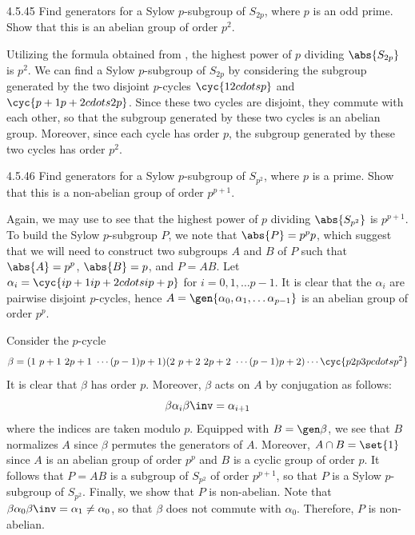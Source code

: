 \begin{exercise}{4.5.45}
	Find generators for a Sylow $p$-subgroup of $S_{2p}$, where $p$ is an odd prime.
	Show that this is an abelian group of order $p^2$.
\end{exercise}

\begin{sol}
	Utilizing the formula obtained from , the highest power of $p$ dividing $\abs{S_{2p}}$ is $p^2$.
	We can find a Sylow $p$-subgroup of $S_{2p}$ by considering the subgroup generated by the two disjoint $p$-cycles $\cyc{1 2 cdots p}$ and $\cyc{p + 1 p + 2 cdots 2p}$.
	Since these two cycles are disjoint, they commute with each other, so that the subgroup generated by these two cycles is an abelian group.
	Moreover, since each cycle has order $p$, the subgroup generated by these two cycles has order $p^2$.
\end{sol}

\begin{exercise}{4.5.46}
	Find generators for a Sylow $p$-subgroup of $S_{p^2}$, where $p$ is a prime.
	Show that this is a non-abelian group of order $p^{p + 1}$.
\end{exercise}

\begin{sol}
	Again, we may use  to see that the highest power of $p$ dividing $\abs{S_{p^2}}$ is $p^{p + 1}$.
	To build the Sylow $p$-subgroup $P$, we note that $\abs{P} = p^p p$, which suggest that we will need to construct two subgroups $A$ and $B$ of $P$ such that $\abs{A} = p^p$, $\abs{B} = p$, and $P = AB$.
	Let $\alpha_i = \cyc{ip + 1 ip + 2 cdots ip + p}$ for $i = 0, 1, \ldots p - 1$.
	It is clear that the $\alpha_i$ are pairwise disjoint $p$-cycles, hence $A = \gen{\alpha_0, \alpha_1, \ldots \alpha_{p - 1}}$ is an abelian group of order $p^p$.

	Consider the $p$-cycle
	\[
		\beta = (1\ p + 1\ 2p + 1\ \cdots (p - 1)p + 1)(2\ p + 2\ 2p + 2\ \cdots (p - 1)p + 2) \cdots \cyc{p 2p 3p cdots p^2}
	\]
	It is clear that $\beta$ has order $p$.
	Moreover, $\beta$ acts on $A$ by conjugation as follows:
	\[
		\beta \alpha_i \beta\inv = \alpha_{i + 1}
	\]
	where the indices are taken modulo $p$.
	Equipped with $B = \gen\beta$, we see that $B$ normalizes $A$ since $\beta$ permutes the generators of $A$.
	Moreover, $A \cap B = \set{1}$ since $A$ is an abelian group of order $p^p$ and $B$ is a cyclic group of order $p$.
	It follows that $P = AB$ is a subgroup of $S_{p^2}$ of order $p^{p + 1}$, so that $P$ is a Sylow $p$-subgroup of $S_{p^2}$.
	Finally, we show that $P$ is non-abelian.
	Note that $\beta \alpha_0 \beta\inv = \alpha_1 \neq \alpha_0$, so that $\beta$ does not commute with $\alpha_0$.
	Therefore, $P$ is non-abelian.
\end{sol}

